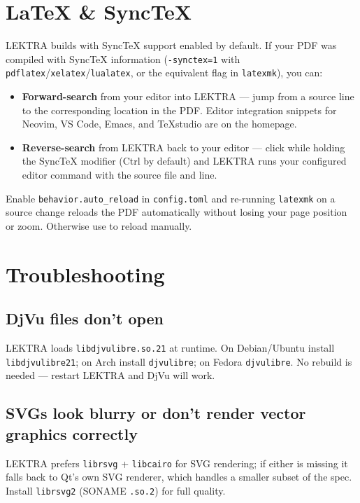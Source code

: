 \documentclass[a4paper,12pt]{article}
\begin{document}
\section{LaTeX \& SyncTeX}

LEKTRA builds with SyncTeX support enabled by default. If your PDF was compiled with SyncTeX information (\texttt{-synctex=1} with \texttt{pdflatex}/\texttt{xelatex}/\texttt{lualatex}, or the equivalent flag in \texttt{latexmk}), you can:

\begin{itemize}[leftmargin=*]
    \item \textbf{Forward-search} from your editor into LEKTRA — jump from a source line to the corresponding location in the PDF. Editor integration snippets for Neovim, VS Code, Emacs, and TeXstudio are on the homepage.
    \item \textbf{Reverse-search} from LEKTRA back to your editor — click while holding the SyncTeX modifier (Ctrl by default) and LEKTRA runs your configured editor command with the source file and line.
\end{itemize}

Enable \texttt{behavior.auto\_\allowbreak{}reload} in \texttt{config.\allowbreak{}toml} and re-running \texttt{latexmk} on a source change reloads the PDF automatically without losing your page position or zoom. Otherwise use  to reload manually.

\section{Troubleshooting}

\subsection{DjVu files don't open}
LEKTRA loads \texttt{libdjvulibre.\allowbreak{}so.21} at runtime. On Debian/Ubuntu install \texttt{libdjvulibre21}; on Arch install \texttt{djvulibre}; on Fedora \texttt{djvulibre}. No rebuild is needed — restart LEKTRA and DjVu will work.

\subsection{SVGs look blurry or don't render vector graphics correctly}
LEKTRA prefers \texttt{librsvg} + \texttt{libcairo} for SVG rendering; if either is missing it falls back to Qt's own SVG renderer, which handles a smaller subset of the spec. Install \texttt{librsvg2} (SONAME \texttt{.\allowbreak{}so.2}) for full quality.
\end{document}
